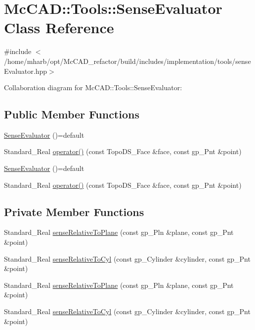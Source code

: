 \hypertarget{classMcCAD_1_1Tools_1_1SenseEvaluator}{}\section{Mc\+C\+AD\+:\+:Tools\+:\+:Sense\+Evaluator Class Reference}
\label{classMcCAD_1_1Tools_1_1SenseEvaluator}


{\ttfamily \#include $<$/home/mharb/opt/\+Mc\+C\+A\+D\+\_\+refactor/build/includes/implementation/tools/sense\+Evaluator.\+hpp$>$}



Collaboration diagram for Mc\+C\+AD\+:\+:Tools\+:\+:Sense\+Evaluator\+:
\subsection*{Public Member Functions}
\begin{DoxyCompactItemize}
\item 
\hyperlink{classMcCAD_1_1Tools_1_1SenseEvaluator_a94ddff3bfe5c393b71a5390cb22cae23}{Sense\+Evaluator} ()=default
\item 
Standard\+\_\+\+Real \hyperlink{classMcCAD_1_1Tools_1_1SenseEvaluator_a3216ae79c31b9bebaf883870b61550b4}{operator()} (const Topo\+D\+S\+\_\+\+Face \&face, const gp\+\_\+\+Pnt \&point)
\item 
\hyperlink{classMcCAD_1_1Tools_1_1SenseEvaluator_a94ddff3bfe5c393b71a5390cb22cae23}{Sense\+Evaluator} ()=default
\item 
Standard\+\_\+\+Real \hyperlink{classMcCAD_1_1Tools_1_1SenseEvaluator_a3216ae79c31b9bebaf883870b61550b4}{operator()} (const Topo\+D\+S\+\_\+\+Face \&face, const gp\+\_\+\+Pnt \&point)
\end{DoxyCompactItemize}
\subsection*{Private Member Functions}
\begin{DoxyCompactItemize}
\item 
Standard\+\_\+\+Real \hyperlink{classMcCAD_1_1Tools_1_1SenseEvaluator_a1ca5a16c81eae36f9b6fdf4beef7d21e}{sense\+Relative\+To\+Plane} (const gp\+\_\+\+Pln \&plane, const gp\+\_\+\+Pnt \&point)
\item 
Standard\+\_\+\+Real \hyperlink{classMcCAD_1_1Tools_1_1SenseEvaluator_ac37a41bbc0027d8821d2cd0d4cd9a542}{sense\+Relative\+To\+Cyl} (const gp\+\_\+\+Cylinder \&cylinder, const gp\+\_\+\+Pnt \&point)
\item 
Standard\+\_\+\+Real \hyperlink{classMcCAD_1_1Tools_1_1SenseEvaluator_a1ca5a16c81eae36f9b6fdf4beef7d21e}{sense\+Relative\+To\+Plane} (const gp\+\_\+\+Pln \&plane, const gp\+\_\+\+Pnt \&point)
\item 
Standard\+\_\+\+Real \hyperlink{classMcCAD_1_1Tools_1_1SenseEvaluator_ac37a41bbc0027d8821d2cd0d4cd9a542}{sense\+Relative\+To\+Cyl} (const gp\+\_\+\+Cylinder \&cylinder, const gp\+\_\+\+Pnt \&point)
\end{DoxyCompactItemize}


